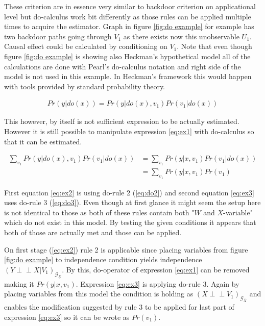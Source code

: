 \documentclass[main=english,12pt,a4paper,pdftex,econ,utf8]{aaltothesis}
\newcommand{\indep}{\perp \!\!\! \perp}
\newcommand{\g}{\mathcal{G}}
\begin{document}
These criterion are in essence very similar to backdoor criterion on applicational level but do-calculus work bit differently as those rules can be applied multiple times to acquire the estimator. Graph in figure \ref{fig:do example} for example has two backdoor paths going through $V_{1}$ as there exists now this unobservable $U_1$. Causal effect could be calculated by conditioning on $V_1$. Note that even though figure \ref{fig:do example} is showing also Heckman's hypothetical model all of the calculations are done with Pearl's do-calculus notation and right side of the model is not used in this example. In Heckman's framework this would happen with tools provided by standard probability theory.



\begin{gather}
    Pr(y|do(x))=Pr(y|do(x),v_1)Pr(v_1|do(x)) \label{eq:ex1}
\end{gather}

\noindent This however, by itself is not sufficient expression to be actually estimated. However it is still possible to manipulate expression \ref{eq:ex1}  with do-calculus so that it can be estimated.

\begin{align}
    \sum_{v_1}Pr(y|do(x), v_1)Pr(v_1|do(x))&=\sum_{v_1}Pr(y|x, v_1)Pr(v_1|do(x)) \label{eq:ex2} \\
    &=\sum_{v_1}Pr(y|x, v_1)Pr(v_1) \label{eq:ex3}
\end{align}

First equation \ref{eq:ex2} is using do-rule 2 (\ref{eq:do2}) and second equation \ref{eq:ex3} uses do-rule 3 (\ref{eq:do3}). Even though at first glance it might seem the setup here is not identical to those as both of these rules contain both "$W$ and $X$-variable" which do not exist in this model. By testing the given conditions it appears that both of those are actually met and those can be applied.

On first stage (\ref{eq:ex2}) rule 2 is applicable since placing variables from figure \ref{fig:do example} to independence condition yields independence $(Y \indep X|V_{1})_{\g_{\underline{X}}}$. By this, do-operator of expression \ref{eq:ex1} can be removed making it $Pr(y|x,v_1)$. Expression \ref{eq:ex3} is applying do-rule 3. Again by placing variables from this model the condition is holding as $(X\indep V_{1})_{\g_{\overline{X}}}$ and enables the modification suggested by rule 3 to be applied for last part of expression \ref{eq:ex3} so it can be wrote as $Pr(v_{1})$.
\end{document}
